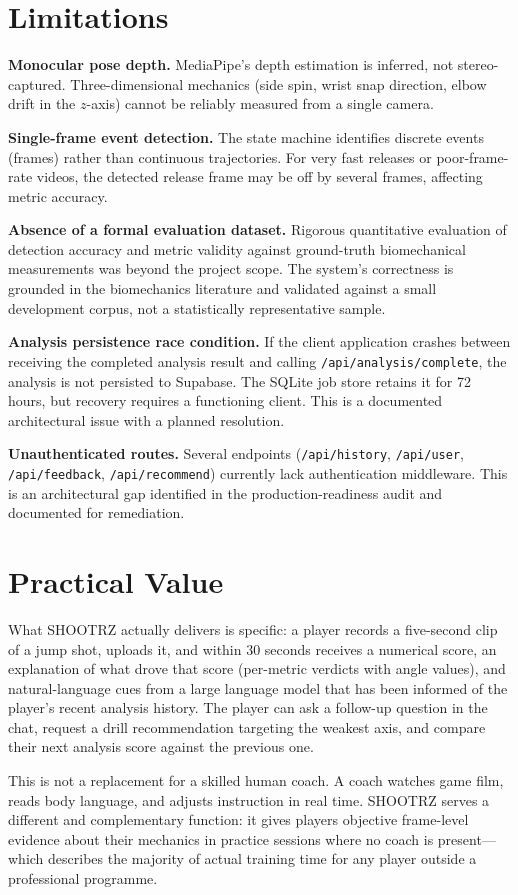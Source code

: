 \section{Limitations}
\label{sec:limitations}

\textbf{Monocular pose depth.}
MediaPipe's depth estimation is inferred, not stereo-captured. Three-dimensional mechanics (side spin, wrist snap direction, elbow drift in the $z$-axis) cannot be reliably measured from a single camera.

\textbf{Single-frame event detection.}
The state machine identifies discrete events (frames) rather than continuous trajectories. For very fast releases or poor-frame-rate videos, the detected release frame may be off by several frames, affecting metric accuracy.

\textbf{Absence of a formal evaluation dataset.}
Rigorous quantitative evaluation of detection accuracy and metric validity against ground-truth biomechanical measurements was beyond the project scope. The system's correctness is grounded in the biomechanics literature and validated against a small development corpus, not a statistically representative sample.

\textbf{Analysis persistence race condition.}
If the client application crashes between receiving the completed analysis result and calling \lstinline|/api/analysis/complete|, the analysis is not persisted to Supabase. The SQLite job store retains it for 72 hours, but recovery requires a functioning client. This is a documented architectural issue with a planned resolution.

\textbf{Unauthenticated routes.}
Several endpoints (\lstinline|/api/history|, \lstinline|/api/user|, \lstinline|/api/feedback|, \lstinline|/api/recommend|) currently lack authentication middleware. This is an architectural gap identified in the production-readiness audit and documented for remediation.

\section{Practical Value}
\label{sec:practical_value}

What SHOOTRZ actually delivers is specific: a player records a five-second clip of a jump shot, uploads it, and within 30 seconds receives a numerical score, an explanation of what drove that score (per-metric verdicts with angle values), and natural-language cues from a large language model that has been informed of the player's recent analysis history. The player can ask a follow-up question in the chat, request a drill recommendation targeting the weakest axis, and compare their next analysis score against the previous one.

This is not a replacement for a skilled human coach. A coach watches game film, reads body language, and adjusts instruction in real time. SHOOTRZ serves a different and complementary function: it gives players objective frame-level evidence about their mechanics in practice sessions where no coach is present---which describes the majority of actual training time for any player outside a professional programme.
